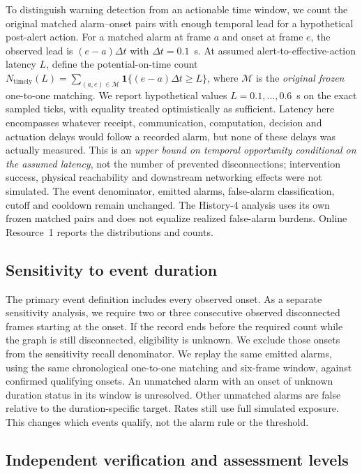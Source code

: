 \documentclass[10pt,a4paper]{article}
\begin{document}
To distinguish warning detection from an actionable time window, we count the original matched alarm--onset pairs with enough temporal lead for a hypothetical post-alert action. For a matched alarm at frame $a$ and onset at frame $e$, the observed lead is $(e-a)\Delta t$ with $\Delta t=0.1$~s. At assumed alert-to-effective-action latency $L$, define the potential-on-time count $N_{\mathrm{timely}}(L)=\sum_{(a,e)\in\mathcal{M}}\mathbf{1}\{(e-a)\Delta t\geq L\}$, where $\mathcal{M}$ is the \emph{original frozen} one-to-one matching. We report hypothetical values $L=0.1,\ldots,0.6$~s on the exact sampled ticks, with equality treated optimistically as sufficient. Latency here encompasses whatever receipt, communication, computation, decision and actuation delays would follow a recorded alarm, but none of these delays was actually measured. This is an \emph{upper bound on temporal opportunity conditional on the assumed latency}, not the number of prevented disconnections; intervention success, physical reachability and downstream networking effects were not simulated. The event denominator, emitted alarms, false-alarm classification, cutoff and cooldown remain unchanged. The History-4 analysis uses its own frozen matched pairs and does not equalize realized false-alarm burdens. Online Resource~1 reports the distributions and counts.

\subsection{Sensitivity to event duration}

The primary event definition includes every observed onset. As a separate sensitivity analysis, we require two or three consecutive observed disconnected frames starting at the onset. If the record ends before the required count while the graph is still disconnected, eligibility is unknown. We exclude those onsets from the sensitivity recall denominator. We replay the same emitted alarms, using the same chronological one-to-one matching and six-frame window, against confirmed qualifying onsets. An unmatched alarm with an onset of unknown duration status in its window is unresolved. Other unmatched alarms are false relative to the duration-specific target. Rates still use full simulated exposure. This changes which events qualify, not the alarm rule or the threshold.

\subsection{Independent verification and assessment levels}
\end{document}
